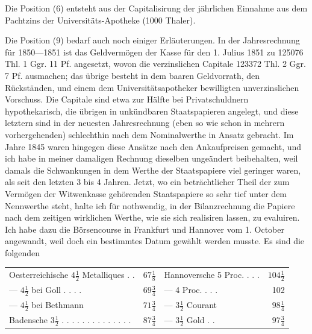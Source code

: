 Die Position (6) entsteht aus der Capitalisirung der jährlichen Einnahme aus dem Pachtzins der Universitäts-Apotheke (1000 Thaler).

Die Position (9) bedarf auch noch einiger Erläuterungen. In der Jahresrechnung für 1850—1851 ist das Geldvermögen der Kasse für den 1. Julius 1851 zu 125076 Thl. 1 Ggr. 11 Pf. angesetzt, wovon die verzinslichen Capitale 123372 Thl. 2 Ggr. 7 Pf. ausmachen; das übrige besteht in dem baaren Geldvorrath, den Rückständen, und einem dem Universitätsapotheker bewilligten unverzinslichen Vorschuss. Die Capitale sind etwa zur Hälfte bei Privatschuldnern hypothekarisch, die übrigen in unkündbaren Staatspapieren angelegt, und diese letztern sind in der neuesten Jahresrechnung (eben so wie schon in mehrern vorhergehenden) schlechthin nach dem Nominalwerthe in Ansatz gebracht. Im Jahre 1845 waren hingegen diese Ansätze nach den Ankaufpreisen gemacht, und ich habe in meiner damaligen Rechnung dieselben ungeändert beibehalten, weil damals die Schwankungen in dem Werthe der Staatspapiere viel geringer waren, als seit den letzten 3 bis 4 Jahren. Jetzt, wo ein beträchtlicher Theil der zum Vermögen der Witwenkasse gehörenden Staatspapiere so sehr tief unter dem Nennwerthe steht, halte ich für nothwendig, in der Bilanzrechnung die Papiere nach dem zeitigen wirklichen Werthe, wie sie sich realisiren lassen, zu evaluiren. Ich habe dazu die Börsencourse in Frankfurt und Hannover vom 1. October angewandt, weil doch ein bestimmtes Datum gewählt werden musste. Es sind die folgenden
\begin{center}
\footnotesize\setlength{\tabcolsep}{2pt}
\begin{tabular}{l r|l r}
Oesterreichische \(4\tfrac{1}{2}\) Metalliques . .&\(67\tfrac{1}{8}\)&Hannoversche 5 Proc. . . .&\(104\tfrac{1}{2}\)\\
— \(4\tfrac{1}{2}\) bei Goll . . . .&\(69\tfrac{3}{4}\)&— 4 Proc. . . .&102\\
— \(4\tfrac{1}{2}\) bei Bethmann&\(71\tfrac{3}{4}\)&— \(3\tfrac{1}{2}\) Courant&\(98\tfrac{1}{4}\)\\
Badensche \(3\tfrac{1}{2}\) . . . . . . . . . . . . . .&\(87\tfrac{3}{4}\)&— \(3\tfrac{1}{2}\) Gold . .&\(97\tfrac{3}{4}\)
\end{tabular}
\end{center}
